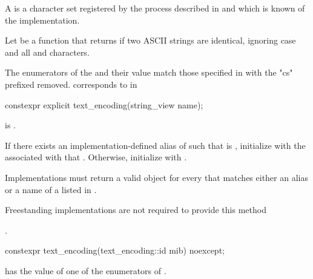 \documentclass{wg21}
\begin{document}
\begin{addedblock}

\pnum A  is a character set registered by the process described in \cite{rfc2978} and which is known of the implementation.

\pnum Let  be a function that returns  if two ASCII strings are identical, ignoring case and all \tcode{-} and  \tcode{_} characters.

\begin{note}
The enumerators of the  and their value match those specified in \cite{rfc3808} with the "cs" prefixed removed.  corresponds to  in \cite{rfc3808}
\end{note}

\begin{itemdecl}
constexpr explicit text_encoding(string_view name);
\end{itemdecl}

\begin{itemdescr}
    \expects {} is .
    
    \effects
    If there exists an implementation-defined alias  of  such that  is , initialize
     with the  associated with that . Otherwise, initialize  with .

    Implementations must return a valid  object for every  that matches either an alias or a name of a  listed in \cite{rfc3808}.

\begin{note}
	Freestanding implementations are not required to provide this method
\end{note}

    \ensures {}.
\end{itemdescr}


\begin{itemdecl}
constexpr text_encoding(text_encoding::id mib) noexcept;
\end{itemdecl}

\begin{itemdescr}
    \expects {}  has the value of one of the enumerators of .
    

\end{itemdescr}
\end{addedblock}
\end{document}
